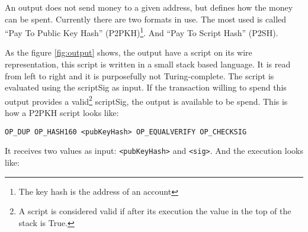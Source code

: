 An output does not send money to a given address, but defines how the money can
  be spent. Currently there are two formats in use. The most used is called
  ``Pay To Public Key Hash'' (P2PKH)\footnote{The key hash is the address of an
  account}. And ``Pay To Script Hash'' (P2SH).

As the figure \ref{fig:output} shows, the output have a script on its wire
  representation, this script is written in a small stack based language.
It is read from left to right and it is purposefully not Turing-complete.
The script is evaluated using the scriptSig as input. If the transaction willing
  to spend this output provides a valid\footnote{A script is considered valid
  if after its execution the value in the top of the stack is True.} scriptSig,
  the output is available to be spend. This is how a P2PKH script looks like:

  \begin{lstlisting}[caption={P2PKH script.},label={lst:p2pkh},frame=single]
  OP_DUP OP_HASH160 <pubKeyHash> OP_EQUALVERIFY OP_CHECKSIG
  \end{lstlisting}

  It receives two values as input:  \lstinline{<pubKeyHash>} and
    \lstinline{<sig>}. And the execution looks like:

